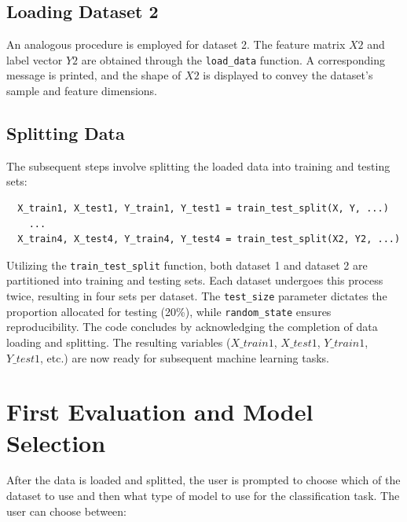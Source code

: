 \documentclass{article}
\begin{document}
\begin{titlepage}
  \subsection{Loading Dataset 2}
  An analogous procedure is employed for dataset 2. The feature matrix \(X2\) and label vector \(Y2\) are obtained through the \texttt{load\_data} function. A corresponding message is printed, and the shape of \(X2\) is displayed to convey the dataset's sample and feature dimensions.

  \subsection{Splitting Data}
  The subsequent steps involve splitting the loaded data into training and testing sets:

  \begin{verbatim}
  X_train1, X_test1, Y_train1, Y_test1 = train_test_split(X, Y, ...)
    ...
  X_train4, X_test4, Y_train4, Y_test4 = train_test_split(X2, Y2, ...)
  \end{verbatim}

  Utilizing the \texttt{train\_test\_split} function, both dataset 1 and dataset 2 are partitioned into training and testing sets. Each dataset undergoes this process twice, resulting in four sets per dataset.
  The \texttt{test\_size} parameter dictates the proportion allocated for testing (20\%), while \texttt{random\_state} ensures reproducibility.
  \newline
  \newline
  The code concludes by acknowledging the completion of data loading and splitting.
  \newline
  \newline
  The resulting variables (\(X\_train1\), \(X\_test1\), \(Y\_train1\), \(Y\_test1\), etc.) are now ready for subsequent machine learning tasks.

  \section*{First Evaluation and Model Selection}
  After the data is loaded and splitted, the user is prompted to choose which of the dataset to use and then what type of model to use for the classification task. The user can choose between:

\end{titlepage}
\end{document}
